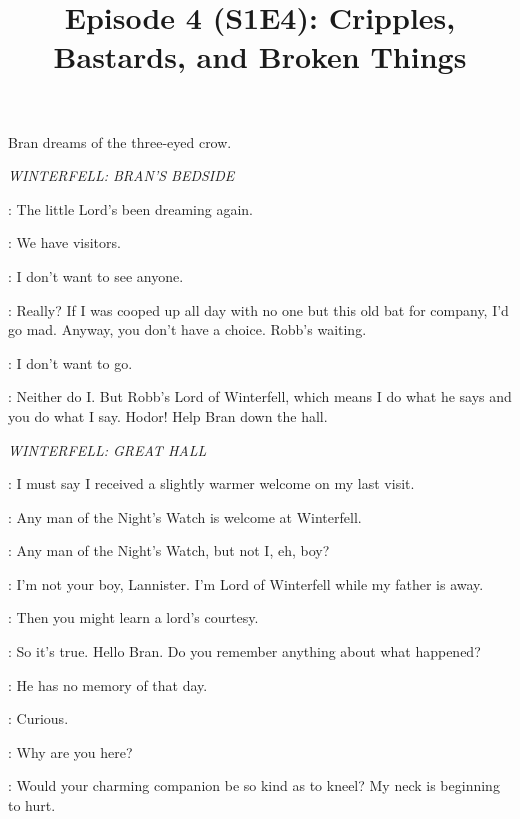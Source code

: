 

\title{Episode 4 (S1E4): Cripples, Bastards, and Broken Things}
\author{}
\date{}
\maketitle



\scene


\n Bran dreams of the three-eyed crow.

\scene


\textit{WINTERFELL: BRAN'S BEDSIDE}


\OLDNAN: The little Lord's been dreaming again. 

\THEON: We have visitors. 

\BRAN: I don't want to see anyone. 

\THEON: Really? If I was cooped up all day with no one but this old bat for company, I'd go mad. Anyway, you don't have a choice. Robb's waiting. 

\BRAN: I don't want to go. 

\THEON: Neither do I. But Robb's Lord of Winterfell, which means I do what he says and you do what I say. Hodor! Help Bran down the hall. 

\scene


\textit{WINTERFELL: GREAT HALL}


\TYRION: I must say I received a slightly warmer welcome on my last visit. 

\ROBB: Any man of the Night's Watch is welcome at Winterfell. 

\TYRION: Any man of the Night's Watch, but not I, eh, boy? 

\ROBB: I'm not your boy, Lannister. I'm Lord of Winterfell while my father is away. 

\TYRION: Then you might learn a lord's courtesy. 


\TYRION: So it's true. Hello Bran. Do you remember anything about what happened? 

\LUWIN: He has no memory of that day. 

\TYRION: Curious. 

\ROBB: Why are you here? 

\TYRION:  Would your charming companion be so kind as to kneel? My neck is beginning to hurt. 

